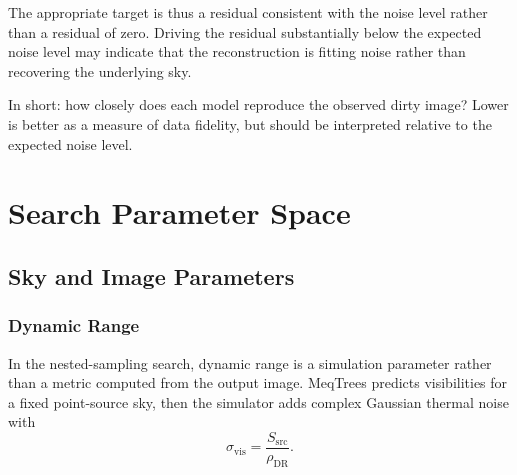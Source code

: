 \documentclass[11pt]{article}
\begin{document}
The appropriate target is thus a residual consistent with the noise level rather than a residual of zero. Driving the residual substantially below the expected noise level may indicate that the reconstruction is fitting noise rather than recovering the underlying sky.

In short: how closely does each model reproduce the observed dirty image? Lower is better as a measure of data fidelity, but should be interpreted relative to the expected noise level.





\section{Search Parameter Space}

\subsection{Sky and Image Parameters}

\subsubsection{Dynamic Range}
\label{sec:param-dynamic-range}

In the nested-sampling search, dynamic range is a simulation parameter rather than a metric computed from the output image.
MeqTrees predicts visibilities for a fixed point-source sky, then the simulator adds complex Gaussian thermal noise with
\begin{equation}
    \sigma_{\text{vis}}
    =
    \frac{S_{\text{src}}}{\rho_{\text{DR}}}.
\end{equation}
\end{document}
